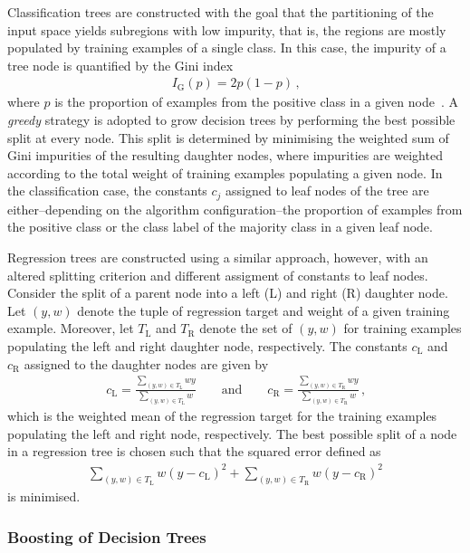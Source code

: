 Classification trees are constructed with the goal that the partitioning of the
input space yields subregions with low impurity, that is, the regions are mostly
populated by training examples of a single class. In this case, the impurity of
a tree node is quantified by the Gini index
\begin{align*}
  I_{\text{G}}(p) = 2 p (1 - p) \,\text{,}
\end{align*}
where $p$ is the proportion of examples from the positive class in a given
node~\cite{hastie09}. A \emph{greedy} strategy is adopted to grow decision trees
by performing the best possible split at every node. This split is determined by
minimising the weighted sum of Gini impurities of the resulting daughter nodes,
where impurities are weighted according to the total weight of training examples
populating a given node. In the classification case, the constants $c_j$
assigned to leaf nodes of the tree are either--depending on the algorithm
configuration--the proportion of examples from the positive class or the class
label of the majority class in a given leaf node.

Regression trees are constructed using a similar approach, however, with an
altered splitting criterion and different assigment of constants to leaf
nodes. Consider the split of a parent node into a left (L) and right (R)
daughter node. Let $(y, w)$ denote the tuple of regression target and weight of
a given training example. Moreover, let $T_{\text{L}}$ and $T_{\text{R}}$ denote
the set of $(y, w)$ for training examples populating the left and right daughter
node, respectively. The constants $c_{\text{L}}$ and $c_{\text{R}}$ assigned to
the daughter nodes are given by
\begin{align*}
  c_{\text{L}} = \frac{\sum_{(y, w) \in T_{\text{L}}} w y}{\sum_{(y, w) \in T_{\text{L}}} w} \qquad \text{and} \qquad c_{\text{R}} = \frac{\sum_{(y, w) \in T_{\text{R}}} w y}{\sum_{(y, w) \in T_{\text{R}}} w} \,\text{,}
\end{align*}
which is the weighted mean of the regression target for the training examples
populating the left and right node, respectively. The best possible split of a
node in a regression tree is chosen such that the squared error defined as
\begin{align*}
  \sum_{(y, w) \in T_{\text{L}}} w (y - c_{\text{L}})^2 + \sum_{(y, w) \in T_{\text{R}} } w (y - c_{\text{R}})^2
\end{align*}
is minimised.


\subsubsection{Boosting of Decision Trees}

